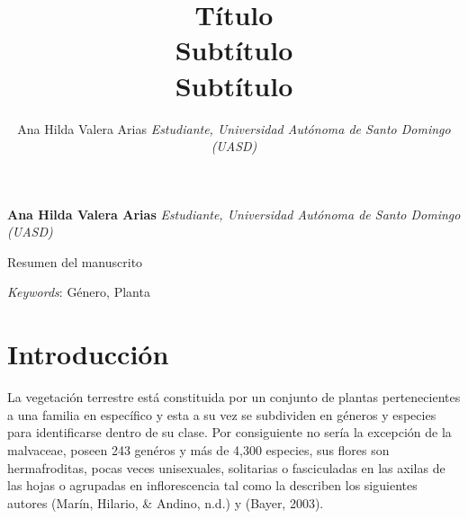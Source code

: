 \documentclass[11pt,]{article}
\title{Título\\
Subtítulo\\
Subtítulo  }
\author{\Large Ana Hilda Valera Arias\vspace{0.05in} \newline\normalsize\emph{Estudiante, Universidad Autónoma de Santo Domingo (UASD)}  }
\date{}
\newcommand*{\authorfont}{\fontfamily{phv}\selectfont}
\renewenvironment{abstract}
 {{%
    \setlength{\leftmargin}{0mm}
    \setlength{\rightmargin}{\leftmargin}%
  }%
  \relax}
 {\endlist}
\begin{document}
	
%

{%
\setlength{\parindent}{0pt}
\thispagestyle{plain}
{\fontsize{18}{20}\selectfont\raggedright 
\maketitle  %

}

{
   \vskip 13.5pt\relax \normalsize\fontsize{11}{12} 
\textbf{\authorfont Ana Hilda Valera Arias} \hskip 15pt \emph{\small Estudiante, Universidad Autónoma de Santo Domingo (UASD)}   

}

}








\begin{abstract}

    \hbox{\vrule height .2pt width 39.14pc}

    \vskip 8.5pt %

\noindent Resumen del manuscrito


\vskip 8.5pt \noindent \emph{Keywords}: Género, Planta \par

    \hbox{\vrule height .2pt width 39.14pc}



\end{abstract}


\vskip 6.5pt


\noindent  \section{Introducción}\label{introducciuxf3n}

La vegetación terrestre está constituida por un conjunto de plantas
pertenecientes a una familia en específico y esta a su vez se subdividen
en géneros y especies para identificarse dentro de su clase. Por
consiguiente no sería la excepción de la malvaceae, poseen 243 genéros y
más de 4,300 especies, sus flores son hermafroditas, pocas veces
unisexuales, solitarias o fasciculadas en las axilas de las hojas o
agrupadas en inflorescencia tal como la describen los siguientes autores
(Marín, Hilario, \& Andino, n.d.) y (Bayer, 2003).
\end{document}

